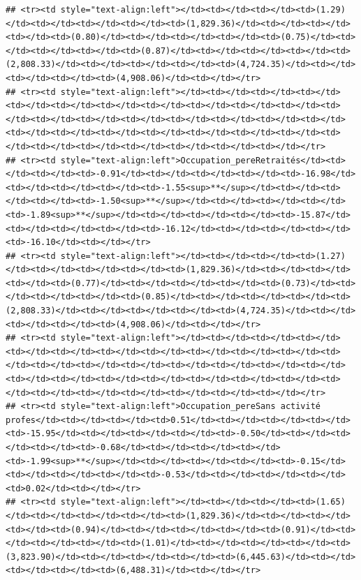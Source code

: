 \documentclass[
]{article}
\begin{document}
\begin{verbatim}
## <tr><td style="text-align:left"></td><td></td><td></td><td>(1.29)</td><td></td><td></td><td></td><td>(1,829.36)</td><td></td><td></td><td></td><td>(0.80)</td><td></td><td></td><td></td><td>(0.75)</td><td></td><td></td><td></td><td>(0.87)</td><td></td><td></td><td></td><td>(2,808.33)</td><td></td><td></td><td></td><td>(4,724.35)</td><td></td><td></td><td></td><td>(4,908.06)</td><td></td></tr>
## <tr><td style="text-align:left"></td><td></td><td></td><td></td><td></td><td></td><td></td><td></td><td></td><td></td><td></td><td></td><td></td><td></td><td></td><td></td><td></td><td></td><td></td><td></td><td></td><td></td><td></td><td></td><td></td><td></td><td></td><td></td><td></td><td></td><td></td><td></td><td></td></tr>
## <tr><td style="text-align:left">Occupation_pereRetraités</td><td></td><td></td><td>-0.91</td><td></td><td></td><td></td><td>-16.98</td><td></td><td></td><td></td><td>-1.55<sup>**</sup></td><td></td><td></td><td></td><td>-1.50<sup>**</sup></td><td></td><td></td><td></td><td>-1.89<sup>**</sup></td><td></td><td></td><td></td><td>-15.87</td><td></td><td></td><td></td><td>-16.12</td><td></td><td></td><td></td><td>-16.10</td><td></td></tr>
## <tr><td style="text-align:left"></td><td></td><td></td><td>(1.27)</td><td></td><td></td><td></td><td>(1,829.36)</td><td></td><td></td><td></td><td>(0.77)</td><td></td><td></td><td></td><td>(0.73)</td><td></td><td></td><td></td><td>(0.85)</td><td></td><td></td><td></td><td>(2,808.33)</td><td></td><td></td><td></td><td>(4,724.35)</td><td></td><td></td><td></td><td>(4,908.06)</td><td></td></tr>
## <tr><td style="text-align:left"></td><td></td><td></td><td></td><td></td><td></td><td></td><td></td><td></td><td></td><td></td><td></td><td></td><td></td><td></td><td></td><td></td><td></td><td></td><td></td><td></td><td></td><td></td><td></td><td></td><td></td><td></td><td></td><td></td><td></td><td></td><td></td><td></td></tr>
## <tr><td style="text-align:left">Occupation_pereSans activité profes</td><td></td><td></td><td>0.51</td><td></td><td></td><td></td><td>-15.95</td><td></td><td></td><td></td><td>-0.50</td><td></td><td></td><td></td><td>-0.68</td><td></td><td></td><td></td><td>-1.99<sup>**</sup></td><td></td><td></td><td></td><td>-0.15</td><td></td><td></td><td></td><td>-0.53</td><td></td><td></td><td></td><td>0.02</td><td></td></tr>
## <tr><td style="text-align:left"></td><td></td><td></td><td>(1.65)</td><td></td><td></td><td></td><td>(1,829.36)</td><td></td><td></td><td></td><td>(0.94)</td><td></td><td></td><td></td><td>(0.91)</td><td></td><td></td><td></td><td>(1.01)</td><td></td><td></td><td></td><td>(3,823.90)</td><td></td><td></td><td></td><td>(6,445.63)</td><td></td><td></td><td></td><td>(6,488.31)</td><td></td></tr>

\end{verbatim}
\end{document}
